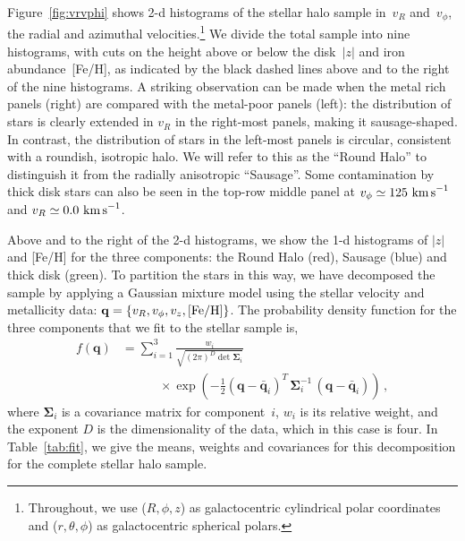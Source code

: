 \documentclass[prd,10pt,twocolumn,showpacs,nofootinbib,aps,superscriptaddress,preprintnumbers]{revtex4-1}
\newcommand{\kms}{\textrm{ km \!s}^{-1}}
\begin{document}
 Figure~\ref{fig:vrvphi} shows 2-d histograms of the stellar halo sample
 in~$v_R$ and~$v_\phi$, the radial and azimuthal
 velocities.\footnote{Throughout, we use ($R,\phi, z$) as
   galactocentric cylindrical polar coordinates and ($r,\theta,\phi$)
 as galactocentric spherical polars.}
 We divide the total sample into nine histograms, with cuts on the
 height above or below the disk~$|z|$ and iron abundance~[Fe/H], as
 indicated by the black dashed lines above and to the right of the nine
 histograms.  A striking observation can be made when the metal rich
 panels (right) are compared with the metal-poor panels (left):
 the distribution of stars is clearly extended in $v_R$ in the
 right-most panels, making it sausage-shaped.  In contrast, the
 distribution of stars in the left-most panels is circular, consistent
 with a roundish, isotropic halo.  We will refer to this as the ``Round Halo'' to distinguish it from the
 radially anisotropic ``Sausage''.  Some contamination by thick disk
 stars can also be seen in the top-row middle panel at $v_\phi\simeq 125 \kms$ and $v_R\simeq0.0
 \kms$.

 Above and to the right of the 2-d histograms, we show the 1-d histograms of $|z|$
  and [Fe/H] for the three components: the Round Halo (red),
 Sausage (blue) and thick disk (green). To partition the stars in this
 way, we have decomposed the sample by applying a Gaussian mixture
 model using the stellar velocity and metallicity data: $\mathbf{q} =
 \{v_R,v_\phi,v_z,[{\rm Fe/H}]\}$. The probability density function for
 the three components that we fit to the stellar sample is,
 \begin{equation}\label{eq:gaussian}
 \begin{split}
 f(\mathbf{q}) &= \sum_{i=1}^{3} \frac{w_i}{\sqrt{(2\pi)^D \det{\boldsymbol{\Sigma}_i}}} \\
 &\qquad \quad \times \exp\left(-\frac{1}{2} (\mathbf{q}-\bar{\mathbf{q}}_i)^T \,\boldsymbol{\Sigma}_i^{-1}\, (\mathbf{q}-\bar{\mathbf{q}}_i)\right) \, ,
 \end{split}
 \end{equation}
 where $\boldsymbol{\Sigma}_i$ is a covariance matrix for
 component~$i$, $w_i$ is its relative weight, and the exponent $D$ is
 the dimensionality of the data, which in this case is four.  In
 Table~\ref{tab:fit}, we give the means, weights and covariances for
 this decomposition for the complete stellar halo sample.
\end{document}
